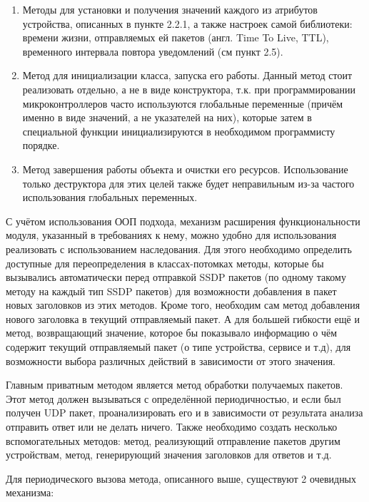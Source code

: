 \begin{enumerate}
	\item Методы для установки и получения значений каждого из атрибутов устройства, описанных в пункте 2.2.1, а также настроек самой библиотеки: времени жизни, отправляемых ей пакетов (англ. Time To Live, TTL), временного интервала повтора уведомлений (см пункт 2.5).
	\item Метод для инициализации класса, запуска его работы.
	Данный метод стоит реализовать отдельно, а не в виде конструктора, т.к. при программировании микроконтроллеров часто используются глобальные переменные (причём именно в виде значений, а не указателей на них), которые затем в специальной функции инициализируются в необходимом программисту порядке.
	\item Метод завершения работы объекта и очистки его ресурсов.
	Использование только деструктора для этих целей также будет неправильным из-за частого использования глобальных переменных.
\end{enumerate}

С учётом использования ООП подхода, механизм расширения функциональности модуля, указанный в требованиях к нему, можно удобно для использования реализовать с использованием наследования.
Для этого необходимо определить доступные для переопределения в классах-потомках методы, которые бы вызывались автоматически перед отправкой SSDP пакетов (по одному такому методу на каждый тип SSDP пакетов) для возможности добавления в пакет новых заголовков из этих методов.
Кроме того, необходим сам метод добавления нового заголовка в текущий отправляемый пакет.
А для большей гибкости ещё и метод, возвращающий значение, которое бы показывало информацию о чём содержит текущий отправляемый пакет (о типе устройства, сервисе и т.д), для возможности выбора различных действий в зависимости от этого значения.

Главным приватным методом является метод обработки получаемых пакетов.
Этот метод должен вызываться с определённой периодичностью, и если был получен UDP пакет, проанализировать его и в зависимости от результата анализа отправить ответ или не делать ничего.
Также необходимо создать несколько вспомогательных методов: метод, реализующий отправление пакетов другим устройствам, метод, генерирующий значения заголовков для ответов и т.д.

Для периодического вызова метода, описанного выше, существуют 2 очевидных механизма:


